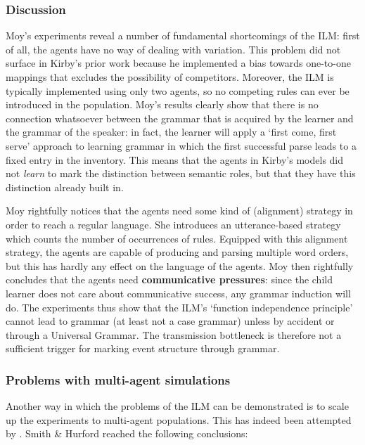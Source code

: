 \subsubsection{Discussion}
Moy's experiments reveal a number of fundamental shortcomings of the ILM: first of all, the agents have no way of dealing with variation. This problem did not surface in Kirby's prior work because he implemented a bias towards one-to-one mappings that excludes the possibility of competitors. Moreover, the ILM is typically implemented using only two agents, so no competing rules can ever be introduced in the population. Moy's results clearly show that there is no connection whatsoever between the grammar that is acquired by the learner and the grammar of the speaker: in fact, the learner will apply a `first come, first serve' approach to learning grammar in which the first successful parse leads to a fixed entry in the inventory. This means that the agents in Kirby's models did not {\em learn} to mark the distinction between semantic roles, but that they have this distinction already built in.

Moy rightfully notices that the agents need some kind of (alignment) strategy in order to reach a regular language. She introduces an utterance-based strategy which counts the number of occurrences of rules. Equipped with this alignment strategy, the agents are capable of producing and parsing multiple word orders, but this has hardly any effect on the language of the agents. Moy then rightfully concludes that the agents need {\bfseries communicative pressures}: since the child learner does not care about communicative success, any grammar induction will do. The experiments thus show that the ILM's `function independence principle' cannot lead to grammar (at least not a case grammar) unless by accident or through a Universal Grammar. The transmission bottleneck is therefore not a sufficient trigger for marking event structure through grammar.


\subsubsection{Problems with multi-agent simulations}
Another way in which the problems of the ILM can be demonstrated is to scale up the experiments to multi-agent populations. This has indeed been attempted by \citet{smith03language}. Smith \& Hurford reached the following conclusions:

